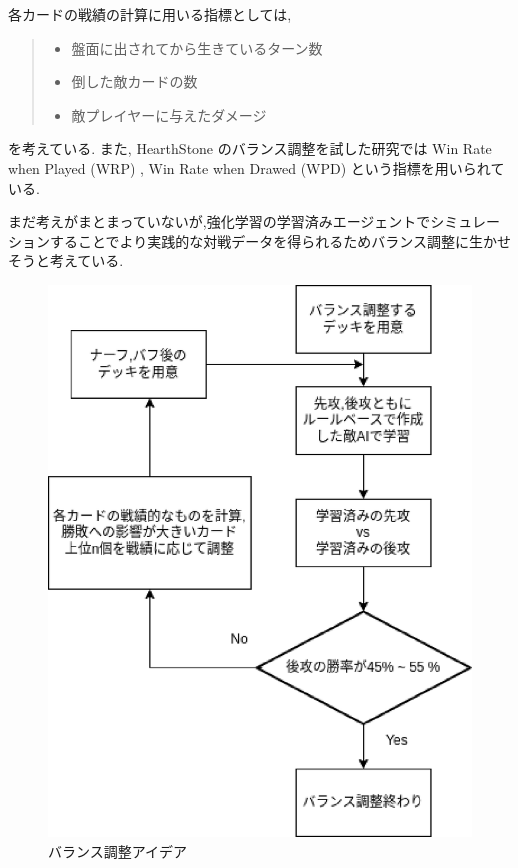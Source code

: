 \documentclass{jarticle}     %
\begin{document}
 各カードの戦績の計算に用いる指標としては,
 \begin{quote}
  \begin{itemize}
   \item 盤面に出されてから生きているターン数
   \item 倒した敵カードの数
   \item 敵プレイヤーに与えたダメージ
  \end{itemize}
 \end{quote}
 を考えている.
 また, HearthStone のバランス調整を試した研究\cite{HearthStone}では Win Rate when Played (WRP) , Win Rate when Drawed (WPD) という指標を用いられている.\par
 まだ考えがまとまっていないが,強化学習の学習済みエージェントでシミュレーションすることでより実践的な対戦データを得られるためバランス調整に生かせそうと考えている.



\begin{figure}[H]
  \centering
  \includegraphics[width=120mm]{assets/ideaimage.eps}
  \caption{バランス調整アイデア}
  \label{fig:idea}
\end{figure}
\end{document}
